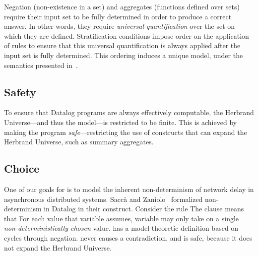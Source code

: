 Negation (non-existence in a set) and aggregates (functions defined over sets)
require their input set to be fully determined in order to produce a correct
answer.  In other words, they require {\em universal quantification} over the
set on which they are defined.  Stratification conditions impose order on the
application of rules to ensure that this universal quantification is always
applied after the input set is fully determined.  This ordering induces a
unique model, under the semantics presented in~\cite{wellfounded}.

\subsection{Safety}

To ensure that Datalog programs are always effectively computable, the Herbrand
Universe---and thus the model---is restricted to be finite.  This is
achieved by making the program {\em safe}---restricting the use of constructs
that can expand the Herbrand Universe, such as summary aggregates.


\subsection{Choice}

One of our goals for \lang is to model the inherent non-determinism of network
delay in asynchronous distributed systems.  Sacc\`{a} and
Zaniolo~\cite{sacca-zaniolo} formalized non-determinism in Datalog in their
 construct.  Consider the rule  The  clause means that For each
value that variable  assumes, variable  may only take on
a single {\em non-deterministically chosen} value.   has a
model-theoretic definition based on cycles through negation.  
never causes a contradiction, and is safe, because it does not expand the
Herbrand Universe.

